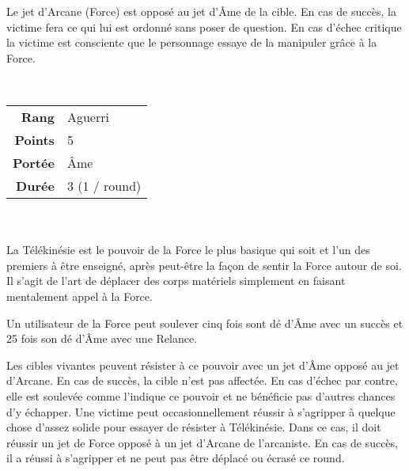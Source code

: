\begin{description}[align=left]
		Le jet d’Arcane (Force) est opposé au jet d’\^Ame de la cible. En cas de succès, la victime fera ce qui lui est ordonné sans poser de question. En cas d’échec critique la victime est consciente que le personnage essaye de la manipuler grâce à la Force.
        \\

    \item [Télékinésie] ~ \\

        \begin{tabular}{ r l }
            \textbf{Rang}    & Aguerri \\
            \textbf{Points}  & 5 \\
            \textbf{Portée}  & \^Ame \\
            \textbf{Durée}   & 3 (1 / round) \\
        \end{tabular}
        \\ \\
        La Télékinésie est le pouvoir de la Force le plus basique qui soit et l’un des premiers à être enseigné, après peut-être la façon de sentir la Force autour de soi. Il s’agit de l’art de déplacer des corps matériels simplement en faisant mentalement appel à la Force.

        Un utilisateur de la Force peut soulever cinq fois sont dé d’\^Ame avec un succès et 25 fois son dé d’\^Ame avec une Relance.

        Les cibles vivantes peuvent résister à ce pouvoir avec un jet d’\^Ame opposé au jet d’Arcane. En cas de succès, la cible n’est pas affectée. En cas d’échec par contre, elle est soulevée comme l’indique ce pouvoir et ne bénéficie pas d’autres chances d’y échapper. Une victime peut occasionnellement réussir à s’agripper à quelque chose d’assez solide pour essayer de résister à Télékinésie. Dans ce cas, il doit réussir un jet de Force opposé à un jet d’Arcane de l’arcaniste. En cas de succès, il a réussi à s’agripper et ne peut pas être déplacé ou écrasé ce round.
        \\

    \item [Télépathie] ~ \\


\end{description}
